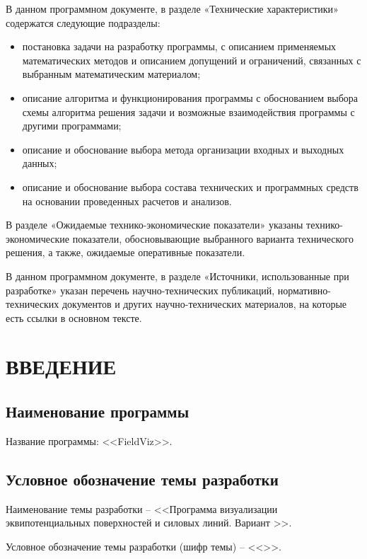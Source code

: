 \documentclass[14pt,a4paper,final]{extreport}
\begin{document}
В данном программном документе, в разделе «Технические характеристики» содержатся следующие подразделы:
\begin{itemize}
	\item	постановка задачи на разработку программы, с описанием применяемых математических методов и описанием допущений и ограничений, связанных с выбранным математическим материалом; 
	\item	описание алгоритма и функционирования программы с обоснованием выбора схемы алгоритма решения задачи и возможные взаимодействия программы с другими программами; 
	\item	описание и обоснование выбора метода организации входных и выходных данных; 
	\item	описание и обоснование выбора состава технических и программных средств на основании проведенных расчетов и анализов.
\end{itemize}

В разделе «Ожидаемые технико-экономические показатели» указаны технико-экономические показатели, обосновывающие выбранного варианта технического решения, а также, ожидаемые оперативные показатели. 

В данном программном документе, в разделе «Источники, использованные при разработке» указан перечень научно-технических публикаций, нормативно-технических документов и других научно-технических материалов, на которые есть ссылки в основном тексте.

\pagebreak


\tableofcontents

\pagebreak

\chapter{ВВЕДЕНИЕ}
\section{Наименование программы}
Название программы: <<FieldViz>>.

\section{Условное обозначение темы разработки}
Наименование темы разработки -- <<Программа визуализации эквипотенциальных поверхностей и силовых линий. Вариант \variant>>.

Условное обозначение темы разработки (шифр темы) -- <<\cipher>>.
\end{document}
